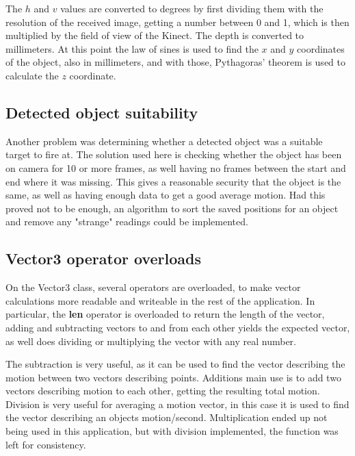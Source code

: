 The $h$ and $v$ values are converted to degrees by first dividing them with the resolution of the received image, getting
a number between 0 and 1, which is then multiplied by the field of view of the Kinect. The depth is converted to
millimeters. At this point the law of sines is used to find the $x$ and $y$ coordinates of the object, also in
millimeters, and with those, Pythagoras' theorem is used to calculate the $z$ coordinate.



\subsection{Detected object suitability}

Another problem was determining whether a detected object was a suitable target to fire at. The solution used here is
checking whether the object has been on camera for 10 or more frames, as well having no frames between the start and
end where it was missing. This gives a reasonable security that the object is the same, as well as having enough data
to get a good average motion. Had this proved not to be enough, an algorithm to sort the saved positions for an object
and remove any "strange" readings could be implemented.

\subsection{Vector3 operator overloads}

On the Vector3 class, several operators are overloaded, to make vector calculations more readable and writeable in the
rest of the application. In particular, the \textbf{len} operator is overloaded to return the length of the vector, 
adding and subtracting vectors to and from each other yields the expected vector, as well does dividing or multiplying
the vector with any real number.

The subtraction is very useful, as it can be used to find the vector describing the motion between two vectors describing
points. Additions main use is to add two vectors describing motion to each other, getting the resulting total motion.
Division is very useful for averaging a motion vector, in this case it is used to find the vector describing an objects
motion/second. Multiplication ended up not being used in this application, but with division implemented, the function
was left for consistency.
